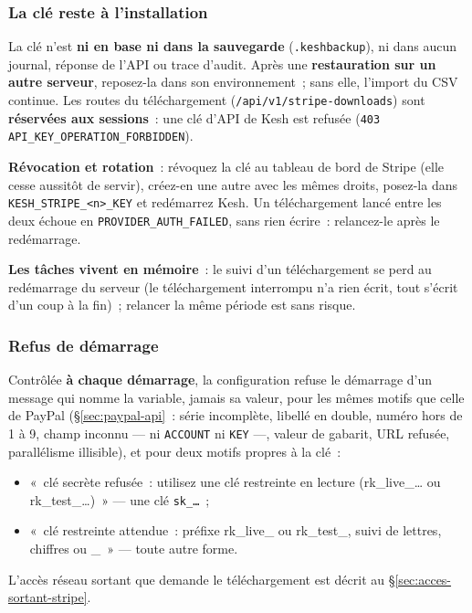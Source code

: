 \documentclass[a4paper,11pt,oneside]{article}
\begin{document}
\subsubsection{La clé reste à l'installation}

La clé n'est \textbf{ni en base ni dans la sauvegarde} (\texttt{.keshbackup}), ni dans aucun journal, réponse de l'API ou trace d'audit. Après une \textbf{restauration sur un autre serveur}, reposez-la dans son environnement~; sans elle, l'import du CSV continue. Les routes du téléchargement (\texttt{/api/v1/stripe-downloads}) sont \textbf{réservées aux sessions}~: une clé d'API de Kesh est refusée (\texttt{403 API\_KEY\_OPERATION\_FORBIDDEN}).

\textbf{Révocation et rotation}~: révoquez la clé au tableau de bord de Stripe (elle cesse aussitôt de servir), créez-en une autre avec les mêmes droits, posez-la dans \texttt{KESH\_STRIPE\_<n>\_KEY} et redémarrez Kesh. Un téléchargement lancé entre les deux échoue en \texttt{PROVIDER\_AUTH\_FAILED}, sans rien écrire~: relancez-le après le redémarrage.

\textbf{Les tâches vivent en mémoire}~: le suivi d'un téléchargement se perd au redémarrage du serveur (le téléchargement interrompu n'a rien écrit, tout s'écrit d'un coup à la fin)~; relancer la même période est sans risque.

\subsubsection{Refus de démarrage}

Contrôlée \textbf{à chaque démarrage}, la configuration refuse le démarrage d'un message qui nomme la variable, jamais sa valeur, pour les mêmes motifs que celle de PayPal (\S\ref{sec:paypal-api}~: série incomplète, libellé en double, numéro hors de 1 à 9, champ inconnu --- ni \texttt{ACCOUNT} ni \texttt{KEY} ---, valeur de gabarit, URL refusée, parallélisme illisible), et pour deux motifs propres à la clé~:
\begin{itemize}
    \item «~clé secrète refusée~: utilisez une clé restreinte en lecture (rk\_live\_… ou rk\_test\_…)~» --- une clé \texttt{sk\_…}~;
    \item «~clé restreinte attendue~: préfixe rk\_live\_ ou rk\_test\_, suivi de lettres, chiffres ou \_~» --- toute autre forme.
\end{itemize}

L'accès réseau sortant que demande le téléchargement est décrit au \S\ref{sec:acces-sortant-stripe}.
\end{document}
